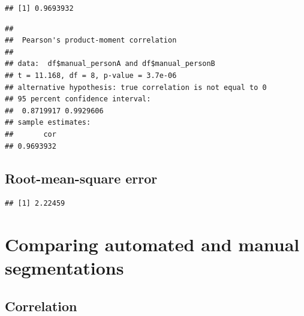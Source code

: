 \documentclass[
]{article}
\newenvironment{Shaded}{\begin{snugshade}}{\end{snugshade}}
\newcommand{\DecValTok}[1]{\textcolor[rgb]{0.00,0.00,0.81}{#1}}
\newcommand{\FloatTok}[1]{\textcolor[rgb]{0.00,0.00,0.81}{#1}}
\newcommand{\KeywordTok}[1]{\textcolor[rgb]{0.13,0.29,0.53}{\textbf{#1}}}
\newcommand{\NormalTok}[1]{#1}
\newcommand{\OperatorTok}[1]{\textcolor[rgb]{0.81,0.36,0.00}{\textbf{#1}}}
\newcommand{\StringTok}[1]{\textcolor[rgb]{0.31,0.60,0.02}{#1}}
\begin{document}
\begin{verbatim}
## [1] 0.9693932
\end{verbatim}

\begin{Shaded}
\end{Shaded}

\begin{verbatim}
## 
##  Pearson's product-moment correlation
## 
## data:  df$manual_personA and df$manual_personB
## t = 11.168, df = 8, p-value = 3.7e-06
## alternative hypothesis: true correlation is not equal to 0
## 95 percent confidence interval:
##  0.8719917 0.9929606
## sample estimates:
##       cor 
## 0.9693932
\end{verbatim}

\hypertarget{root-mean-square-error}{%
\subsection{Root-mean-square error}\label{root-mean-square-error}}

\begin{Shaded}
\end{Shaded}

\begin{verbatim}
## [1] 2.22459
\end{verbatim}

\hypertarget{comparing-automated-and-manual-segmentations}{%
\section{Comparing automated and manual
segmentations}\label{comparing-automated-and-manual-segmentations}}

\hypertarget{correlation-1}{%
\subsection{Correlation}\label{correlation-1}}
\end{document}

